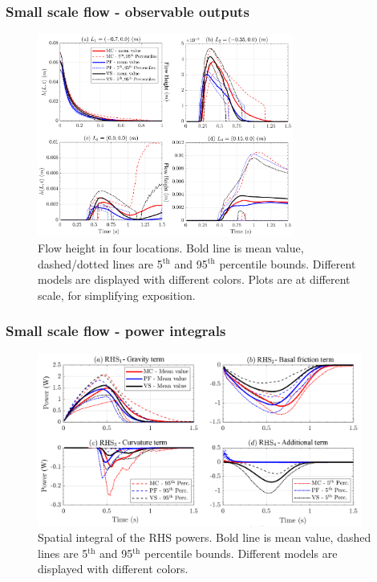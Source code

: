 \documentclass{beamer}
\begin{document}
\begin{frame}
\frametitle{Small scale flow - \small{observable outputs}}
\begin{figure}
\includegraphics[width=0.75\textwidth]{figures/incline/Height.png}
        \caption{Flow height in four locations. Bold line is mean value, dashed/dotted lines are 5$^{\mathrm{th}}$ and 95$^{\mathrm{th}}$ percentile bounds. Different models are displayed with different colors. Plots are at different scale, for simplifying exposition.}
\end{figure}
\end{frame}

\begin{frame}
\frametitle{Small scale flow - \small{power integrals}}
\begin{figure}
\includegraphics[width=0.95\textwidth]{figures/incline/PowersIncline.png}
        \caption{Spatial integral of the RHS powers. Bold line is mean value, dashed lines are 5$^{\mathrm{th}}$ and 95$^{\mathrm{th}}$ percentile bounds. Different models are displayed with different colors.}
\end{figure}
\end{frame}
\end{document}
